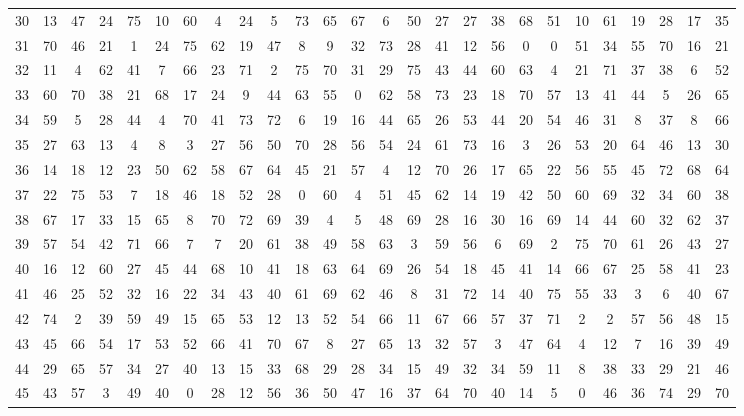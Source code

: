\begin{table}
\begin{tabular}{c c c c c c c c c c c c c c c c c c c c c c c c c c }
30 & 13 & 47 & 24 & 75 & 10 & 60 & 4 & 24 & 5 & 73 & 65 & 67 & 6 & 50 & 27 & 27 & 38 & 68 & 51 & 10 & 61 & 19 & 28 & 17 & 35 \\
31 & 70 & 46 & 21 & 1 & 24 & 75 & 62 & 19 & 47 & 8 & 9 & 32 & 73 & 28 & 41 & 12 & 56 & 0 & 0 & 51 & 34 & 55 & 70 & 16 & 21 \\
32 & 11 & 4 & 62 & 41 & 7 & 66 & 23 & 71 & 2 & 75 & 70 & 31 & 29 & 75 & 43 & 44 & 60 & 63 & 4 & 21 & 71 & 37 & 38 & 6 & 52 \\
33 & 60 & 70 & 38 & 21 & 68 & 17 & 24 & 9 & 44 & 63 & 55 & 0 & 62 & 58 & 73 & 23 & 18 & 70 & 57 & 13 & 41 & 44 & 5 & 26 & 65 \\
34 & 59 & 5 & 28 & 44 & 4 & 70 & 41 & 73 & 72 & 6 & 19 & 16 & 44 & 65 & 26 & 53 & 44 & 20 & 54 & 46 & 31 & 8 & 37 & 8 & 66 \\
35 & 27 & 63 & 13 & 4 & 8 & 3 & 27 & 56 & 50 & 70 & 28 & 56 & 54 & 24 & 61 & 73 & 16 & 3 & 26 & 53 & 20 & 64 & 46 & 13 & 30 \\
36 & 14 & 18 & 12 & 23 & 50 & 62 & 58 & 67 & 64 & 45 & 21 & 57 & 4 & 12 & 70 & 26 & 17 & 65 & 22 & 56 & 55 & 45 & 72 & 68 & 64 \\
37 & 22 & 75 & 53 & 7 & 18 & 46 & 18 & 52 & 28 & 0 & 60 & 4 & 51 & 45 & 62 & 14 & 19 & 42 & 50 & 60 & 69 & 32 & 34 & 60 & 38 \\
38 & 67 & 17 & 33 & 15 & 65 & 8 & 70 & 72 & 69 & 39 & 4 & 5 & 48 & 69 & 28 & 16 & 30 & 16 & 69 & 14 & 44 & 60 & 32 & 62 & 37 \\
39 & 57 & 54 & 42 & 71 & 66 & 7 & 7 & 20 & 61 & 38 & 49 & 58 & 63 & 3 & 59 & 56 & 6 & 69 & 2 & 75 & 70 & 61 & 26 & 43 & 27 \\
40 & 16 & 12 & 60 & 27 & 45 & 44 & 68 & 10 & 41 & 18 & 63 & 64 & 69 & 26 & 54 & 18 & 45 & 41 & 14 & 66 & 67 & 25 & 58 & 41 & 23 \\
41 & 46 & 25 & 52 & 32 & 16 & 22 & 34 & 43 & 40 & 61 & 69 & 62 & 46 & 8 & 31 & 72 & 14 & 40 & 75 & 55 & 33 & 3 & 6 & 40 & 67 \\
42 & 74 & 2 & 39 & 59 & 49 & 15 & 65 & 53 & 12 & 13 & 52 & 54 & 66 & 11 & 67 & 66 & 57 & 37 & 71 & 2 & 2 & 57 & 56 & 48 & 15 \\
43 & 45 & 66 & 54 & 17 & 53 & 52 & 66 & 41 & 70 & 67 & 8 & 27 & 65 & 13 & 32 & 57 & 3 & 47 & 64 & 4 & 12 & 7 & 16 & 39 & 49 \\
44 & 29 & 65 & 57 & 34 & 27 & 40 & 13 & 15 & 33 & 68 & 29 & 28 & 34 & 15 & 49 & 32 & 34 & 59 & 11 & 8 & 38 & 33 & 29 & 21 & 46 \\
45 & 43 & 57 & 3 & 49 & 40 & 0 & 28 & 12 & 56 & 36 & 50 & 47 & 16 & 37 & 64 & 70 & 40 & 14 & 5 & 0 & 46 & 36 & 74 & 29 & 70 \\

\end{tabular}
\end{table}
